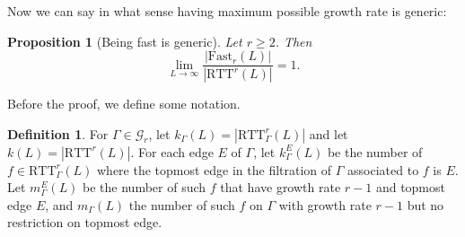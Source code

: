 \documentclass[11pt,oneside]{amsart}
\newcounter{ax}
\newtheorem{prop}[thm]{Proposition}
\theoremstyle{definition}
\newtheorem{defn}[thm]{Definition}
\newcommand{\ttm}{\mathrm{RTT}}
\newcommand{\Fast}{\mathrm{Fast}}
\begin{document}
Now we can say in what sense having maximum possible growth rate is generic:

\begin{prop}[Being fast is generic]\label{prop:fast-generic}
Let $r\geq 2$.  Then 
$$\lim_{L\to\infty} \frac{|\Fast_r(L)|}{|\ttm^r(L)|}=1.$$
\end{prop}

Before the proof, we define some notation.

\begin{defn}\label{defn:fast-count}
For $\Gamma\in\mathcal G_r$, let $k_\Gamma(L)=|\ttm_\Gamma^r(L)|$ and let $k(L)=|\ttm^r(L)|$.  For each edge $E$ of $\Gamma$, let $k^E_\Gamma(L)$ be the number of $f\in\ttm_\Gamma^r(L)$ where the topmost edge in the filtration of $\Gamma$ associated to $f$ is $E$.  Let $m^E_\Gamma(L)$ be the number of such $f$ that have growth rate $r-1$ and topmost edge $E$, and $m_\Gamma(L)$ the number of such $f$ on $\Gamma$ with growth rate $r-1$ but no restriction on topmost edge.
\end{defn}
\end{document}
